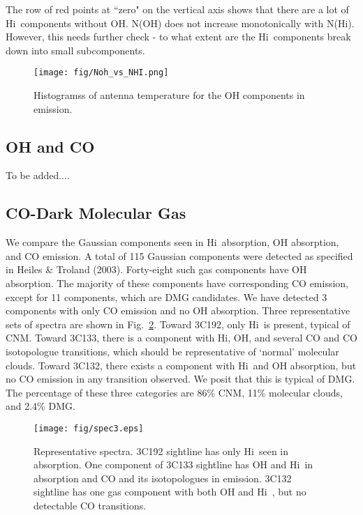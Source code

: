 \documentclass[preprint]{emulateapj}
\def\hi{H{\sc i}}
\begin{document}
The row of red points at ``zero" on the vertical axis shows that there are a lot of \hi\ components without OH. N(OH) does not increase monotonically with N(\hi). However, this needs further check - to what extent are the \hi\ components break down into small subcomponents.  


\begin{figure}
\texttt{[image: fig/Noh\_vs\_NHI.png]}
\caption{Histogramss of  antenna temperature for the OH components in emission.}
\label{fig:Noh_vs_NHI} 
\end{figure}

\subsection{OH and CO}
\label{subsec:ohco}

To be added....

\subsection{CO-Dark Molecular Gas}
\label{subsec:darkgas}

We compare the Gaussian components seen in \hi\ absorption, OH absorption, and CO emission.
A total of 115 Gaussian components were detected as specified in Heiles \& Troland (2003). 
Forty-eight such gas components have OH absorption. The majority of these components  have corresponding CO emission, except for 11 components, which are DMG candidates. We have detected 3 components with only CO emission and no OH absorption.
Three representative sets of spectra are shown in Fig.~\ref{fig4}.  Toward 3C192, only \hi\ is present, typical of CNM. 
Toward 3C133, there is a  component with \hi, OH, and several CO and CO isotopologue transitions, which should be 
representative of `normal' molecular clouds. Toward 3C132, there exists a component with \hi\ and OH absorption, but no CO emission in any transition observed. We posit that this is typical of DMG.  The percentage of these three categories are 86\% CNM,  11\% molecular clouds, and 2.4\% DMG.

\begin{figure}[htp]
\texttt{[image: fig/spec3.eps]}
\caption{Representative spectra. 3C192 sightline has only \hi\ seen in absorption. One component of 3C133 sightline has OH and \hi\ in absorption and CO and its isotopologues in emission. 3C132 sightline has one gas component with both OH and \hi\ , but no detectable CO transitions.}
\label{fig4}
\end{figure}
\end{document}
